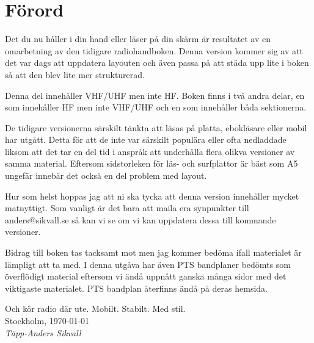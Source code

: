 	\setlength{\parskip}{0.5em}
	\setlength{\parindent}{0pt}
	
	
	
	\section*{Förord}
	
	Det du nu håller i din hand eller läser på din skärm är resultatet av en omarbetning av den tidigare radiohandboken. Denna version kommer sig av att det var dags att uppdatera layouten och även passa på att städa upp lite i boken så att den blev lite mer strukturerad.
	
	Denna del innehåller VHF/UHF men inte HF. Boken finns i två andra delar, en som innehåller HF men inte VHF/UHF och en som innehåller båda sektionerna.
	
	De tidigare versionerna särskilt tänkta att läsas på platta, ebokläsare eller mobil har utgått. Detta för att de inte var särskilt populära eller ofta nedladdade liksom att det tar en del tid i anspråk att underhålla flera olikva versioner av samma material. Eftersom sidstorleken för läs- och surfplattor är bäst som A5 ungefär innebär det också en del problem med layout.
	
	Hur som helst hoppas jag att ni ska tycka att denna version innehåller mycket matnyttigt. Som vanligt är det bara att maila era synpunkter till anders@sikvall.se så kan vi se om vi kan uppdatera dessa till kommande versioner.
	
	Bidrag till boken tas tacksamt mot men jag kommer bedöma ifall materialet är lämpligt att ta med. I denna utgåva har även PTS bandplaner bedömts som överflödigt material eftersom vi ändå uppnått ganska många sidor med det viktigaste materialet. PTS bandplan återfinns ändå på deras hemsida.
	
	Och kör radio där ute. Mobilt. Stabilt. Med stil.\\[4em]
	
	Stockholm, \today\\
	\textit{Täpp-Anders Sikvall}
	
	\clearpage
